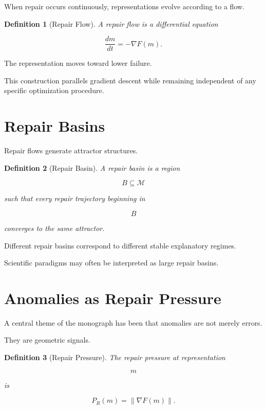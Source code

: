 \documentclass[11pt,oneside,openany]{book}
\newtheorem{definition}{Definition}[chapter] \newtheorem{theorem}{Theorem}[chapter] \newtheorem{proposition}{Proposition}[chapter] \newtheorem{lemma}{Lemma}[chapter] \newtheorem{corollary}{Corollary}[chapter] \newtheorem{remark}{Remark}[chapter]
\begin{document}
When repair occurs continuously, representations evolve according to a flow.

\begin{definition}[Repair Flow]

A repair flow is a differential equation

\[
\frac{dm}{dt}
=
-\nabla F(m).
\]

\end{definition}

The representation moves toward lower failure.

This construction parallels gradient descent while remaining independent of any specific optimization procedure.

\section{Repair Basins}

Repair flows generate attractor structures.

\begin{definition}[Repair Basin]

A repair basin is a region

\[
B\subseteq\mathcal M
\]

such that every repair trajectory beginning in

\[
B
\]

converges to the same attractor.

\end{definition}

Different repair basins correspond to different stable explanatory regimes.

Scientific paradigms may often be interpreted as large repair basins.

\section{Anomalies as Repair Pressure}

A central theme of the monograph has been that anomalies are not merely errors.

They are geometric signals.

\begin{definition}[Repair Pressure]

The repair pressure at representation

\[
m
\]

is

\[
P_R(m)
=
\|\nabla F(m)\|.
\]

\end{definition}
\end{document}
